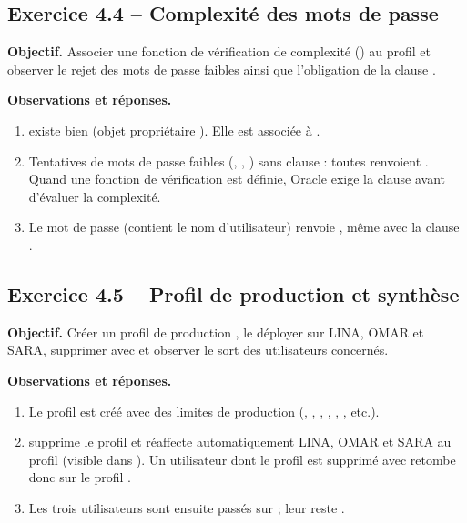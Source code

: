 \subsection{Exercice 4.4 -- Complexité des mots de passe}
\textbf{Objectif.} Associer une fonction de vérification de complexité
() au profil et observer le rejet des mots de passe faibles
ainsi que l'obligation de la clause .


\textbf{Observations et réponses.}
\begin{enumerate}
  \item {} existe bien (objet  propriétaire
        ). Elle est associée à .
  \item Tentatives de mots de passe faibles (, ,
        ) sans clause  : toutes renvoient
        . Quand une fonction de vérification
        est définie, Oracle exige la clause  avant d'évaluer la complexité.
  \item Le mot de passe  (contient le nom d'utilisateur) renvoie
        , même avec la clause
        .
\end{enumerate}

\subsection{Exercice 4.5 -- Profil de production et synthèse}
\textbf{Objectif.} Créer un profil de production , le déployer sur
LINA, OMAR et SARA, supprimer  avec  et observer le sort
des utilisateurs concernés.


\textbf{Observations et réponses.}
\begin{enumerate}
  \item Le profil  est créé avec des limites de production
        (, , , , ,
        , etc.).
  \item {} supprime le profil et réaffecte
        automatiquement LINA, OMAR et SARA au profil  (visible dans
        ). Un utilisateur dont le profil est supprimé avec
         retombe donc sur le profil .
  \item Les trois utilisateurs sont ensuite passés sur  ; leur
         reste .
\end{enumerate}
